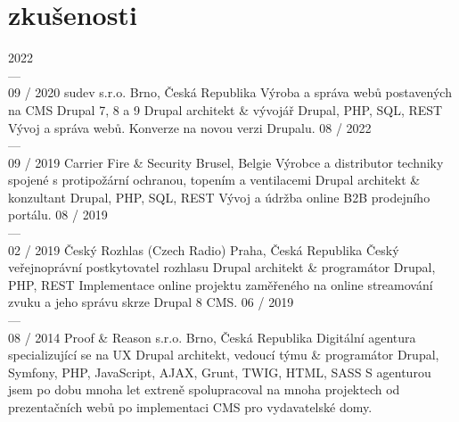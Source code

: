 \documentclass[]{friggeri-cv} %
\begin{document}

\bigskip

\section{zkušenosti}
\begin{entrylist}
  \job
  {2022 \\ --- \\ 09 / 2020}
  {sudev s.r.o.}
  {Brno, Česká Republika}
  {Výroba a správa webů postavených na CMS Drupal 7, 8 a 9}
  {
    \position
    {Drupal architekt \& vývojář}
    {Drupal, PHP, SQL, REST}
    {
      Vývoj a správa webů. Konverze na novou verzi Drupalu.
    }
  }
  \job
  {08 / 2022 \\ --- \\ 09 / 2019}
  {Carrier Fire \& Security}
  {Brusel, Belgie}
  {Výrobce a distributor techniky spojené s protipožární ochranou, topením a ventilacemi}
  {
    \position
      {Drupal architekt \& konzultant}
      {Drupal, PHP, SQL, REST}
      {
        Vývoj a údržba online B2B prodejního portálu.
      }
  }
  \job
  {08 / 2019 \\ --- \\ 02 / 2019}
  {Český Rozhlas (Czech Radio)}
  {Praha, Česká Republika}
  {Český veřejnoprávní postkytovatel rozhlasu}
  {
    \position
      {Drupal architekt \& programátor}
      {Drupal, PHP, REST}
      {
        Implementace online projektu zaměřeného na online streamování zvuku a jeho správu skrze Drupal 8 CMS.
      }
  }
  \job
  {06 / 2019 \\ --- \\ 08 / 2014}
  {Proof \& Reason s.r.o.}
  {Brno, Česká Republika}
  {Digitální agentura specializující se na UX}
  {
    \position
      {Drupal architekt, vedoucí týmu \& programátor}
      {Drupal, Symfony, PHP, JavaScript, AJAX, Grunt, TWIG, HTML, SASS}
      {
        S agenturou jsem po dobu mnoha let extreně spolupracoval na mnoha projektech od prezentačních webů po implementaci CMS
        pro vydavatelské domy.
      }
  }
\end{entrylist}
\end{document}
